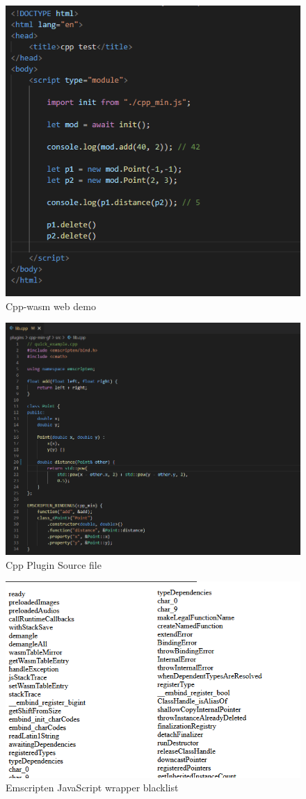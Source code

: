 \begin{figure}
  \graphicspath{{../../assets/images/6.1.3}}
  \centering
  \includegraphics[width=0.50\linewidth]{demo.PNG}
  \caption[loading a plugin]{Cpp-wasm web demo}
  \label{fig:min-cpp-demo}
\end{figure}

\begin{figure}
  \graphicspath{{../../assets/images/6.1.3/}}
  \centering
  \includegraphics[width=0.50\linewidth]{source.PNG}
  \caption[loading a plugin]{Cpp Plugin Source file}
  \label{fig:min-cpp-source}
\end{figure}

\begin{figure}
  \graphicspath{{../../assets/images/6.1.3/}}
  \centering
  \includegraphics[width=0.50\linewidth]{blacklist.PNG}
  \caption[loading a plugin]{Emscripten JavaScript wrapper blacklist }
  \label{fig:min-cpp-whitelist}
\end{figure}

